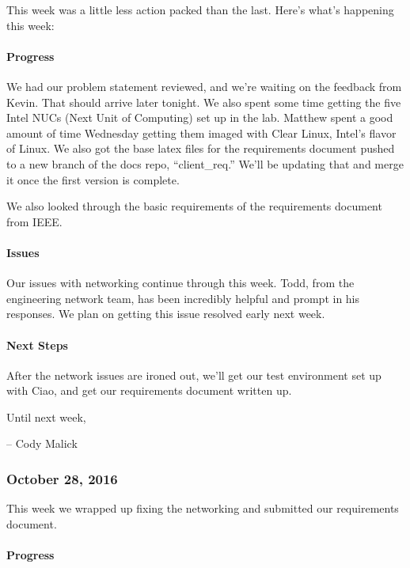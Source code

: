 \documentclass[10pt,onecolumn,journal,draftclsnofoot]{IEEEtran}
\begin{document}
This week was a little less action packed than the last. Here's what's
happening this week:

\paragraph{Progress} 

We had our problem statement reviewed, and we're waiting on the feedback
from Kevin. That should arrive later tonight. We also spent some time
getting the five Intel NUCs (Next Unit of Computing) set up in the lab.
Matthew spent a good amount of time Wednesday getting them imaged with
Clear Linux, Intel's flavor of Linux. We also got the base latex files
for the requirements document pushed to a new branch of the docs repo,
``client\_req.'' We'll be updating that and merge it once the first
version is complete.

We also looked through the basic requirements of the requirements
document from IEEE.

\paragraph{Issues} 

Our issues with networking continue through this week. Todd, from the
engineering network team, has been incredibly helpful and prompt in his
responses. We plan on getting this issue resolved early next week.

\paragraph{Next Steps} 

After the network issues are ironed out, we'll get our test environment
set up with Ciao, and get our requirements document written up.

Until next week,

-- Cody Malick

\subsubsection{October 28, 2016} 

This week we wrapped up fixing the networking and submitted our
requirements document.

\paragraph{Progress} 
\end{document}
